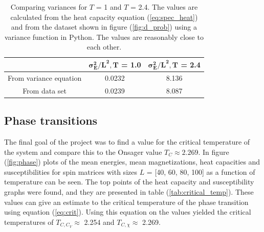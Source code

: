 \documentclass[10pt,a4paper,titlepage]{article}
\begin{document}
\begin{table}[ht!]
\centering
\caption{Comparing variances for $T$ = 1 and $T$ = 2.4. The values are calculated from the heat capacity equation (\ref{eq:spec_heat}) and from the dataset shown in figure (\ref{fig:d_prob}) using a variance function in Python. The values are reasonably close to each other.} \label{tab:d_variance}
\begin{tabular}{| c | c | c |} \hline
 & $\mathbf{\sigma_E^2/L^2, T}$ \textbf{= 1.0} & $\mathbf{\sigma_E^2/L^2, T}$ \textbf{= 2.4} \\ \hline
From variance equation & 0.0232 & 8.136\\ \hline
From data set & 0.0239 & 8.087\\ \hline


\end{tabular}
\end{table}

\subsection{Phase transitions}
The final goal of the project was to find a value for the critical temperature of the system and compare this to the Onsager value $T_C \approx2.269$.
	In figure (\ref{fig:phase}) plots of the mean energies, mean magnetizations, heat capacities and susceptibilities for spin matrices with sizes $L$ = [40, 60, 80, 100] as a function of temperature can be seen. The top points of the heat capacity and susceptibility graphs were found, and they are presented in table (\ref{tab:critical_temp}).
These values can give an estimate to the critical temperature of the phase transition using equation (\ref{eq:crit}). Using this equation on the values yielded the critical temperatures of $T_{C,C_{V}} \approx$ 2.254 and $T_{C, \chi} \approx$ 2.269. 
\end{document}
